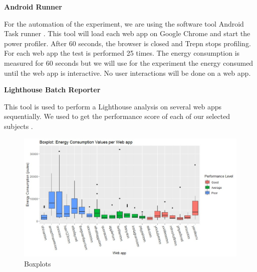 \textbf{Android Runner}

For the automation of the experiment, we are using the software tool Android Task runner \cite{WEBSITE:10}. This tool will load each web app on Google Chrome and start the power profiler. After 60 seconds, the browser is closed and Trepn stops profiling. For each web app the test is performed 25 times. The energy consumption is measured for 60 seconds but we will use for the experiment the energy consumed until the web app is interactive. No user interactions will be done on a web app.
\newline


\textbf{Lighthouse Batch Reporter}

This tool is used to perform a Lighthouse analysis on several web apps sequentially. We used to get the performance score of each of our selected subjects \cite{WEBSITE:12}.

\begin{figure}
  \includegraphics[width=\textwidth]{./Images/boxplot-allecv.jpg}
  \caption{Boxplots}
  \label{fig:boxplots-all}
\end{figure}